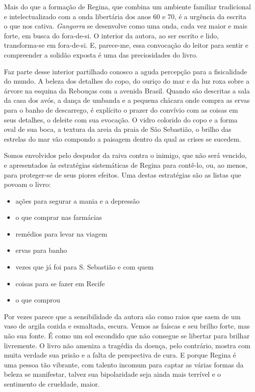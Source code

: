 Mais do que a formação de Regina, que combina um ambiente familiar
tradicional e intelectualizado com a onda libertária dos anos 60 e 70, é
a urgência da escrita o que nos cativa. \emph{Gangorra} se desenvolve
como uma onda, cada vez maior e mais forte, em busca do fora-de-si. O
interior da autora, ao ser escrito e lido, transforma-se em fora-de-si.
E, parece-me, essa convocação do leitor para sentir e compreender a
solidão exposta é uma das preciosidades do livro.

Faz parte desse interior partilhado conosco a aguda percepção para a
fisicalidade do mundo. A beleza dos detalhes do copo, do ouriço do mar e
da luz roxa sobre a árvore na esquina da Rebouças com a avenida Brasil.
Quando são descritas a sala da casa dos avós, a dança de umbanda e a
pequena chácara onde compra as ervas para o banho de descarrego, é
explícito o prazer do convívio com as coisas em seus detalhes, o deleite
com sua evocação. O vidro colorido do copo e a forma oval de sua boca, a
textura da areia da praia de São Sebastião, o brilho das estrelas do mar
vão compondo a paisagem dentro da qual as crises se sucedem.

Somos envolvidos pelo despudor da raiva contra o inimigo, que não será
vencido, e apresentados às estratégias sistemáticas de Regina para
contê-lo, ou, ao menos, para proteger-se de seus piores efeitos. Uma
destas estratégias são as listas que povoam o livro:


\begin{itemize}
\tightlist
\item
  ações para segurar a mania e a depressão
\item
  o que comprar nas farmácias
\item
  remédios para levar na viagem
\item
  ervas para banho
\item
  vezes que já foi para S. Sebastião e com quem
\item
  coisas para se fazer em Recife
\item
  o que comprou
\end{itemize}

Por vezes parece que a sensibilidade da autora são como raios que saem
de um vaso de argila cozida e esmaltada, escura. Vemos as faíscas e seu
brilho forte, mas não sua fonte. É como um sol escondido que não
consegue se libertar para brilhar livremente. O livro não ameniza a
tragédia da doença, pelo contrário, mostra com muita verdade sua prisão
e a falta de perspectiva de cura. E porque Regina é uma pessoa tão
vibrante, com talento incomum para captar as várias formas da beleza se
manifestar, talvez sua bipolaridade seja ainda mais terrível e o
sentimento de crueldade, maior.

